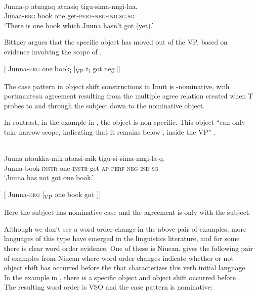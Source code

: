 \documentclass[output=paper]{LSP/langsci}
\begin{document}
\ea\label{ex:woolford:7}
\\
\gll Junna-p    atuagaq  ataasiq  tigu-sima-nngi-laa. \\
     Junaa-\textsc{erg}  book    one    get-\textsc{perf-neg-ind.sg.sg}\\
\glt ‘There is one book which Juuna hasn’t got (yet).’
\z

Bittner argues that the specific object has moved out of the VP, based on evidence involving the scope of . 

\ea\label{ex:woolford:8}
[ Junna-\textsc{erg}  one book\textsubscript{i}  [\textsubscript{VP}  t\textsubscript{i}     got.neg ]]
\z

The case pattern in object shift constructions in Inuit is -nominative, with portmanteau agreement resulting from the multiple agree relation created when T probes to and through the  subject down to the nominative object. 

In contrast, in the example in , the object is non-specific. This object “can only take narrow scope, indicating that it remains below , inside the VP” \citep[35]{bittner1994case}.

\ea\label{ex:woolford:9}
\\
\gll Juuna  ataukka-mik  ataasi-mik  tigu-si-sima-nngi-la-q.                           \\
     Junna  book-\textsc{instr} one-\textsc{instr}  get-\textsc{ap-perf-neg-ind-sg}  \\
\glt ‘Juuna has not got one book.’ 
\z

\ea\label{ex:woolford:10}
[ Junna-\textsc{erg}  [\textsubscript{VP}  one book     got ]]
\z

Here the subject has nominative case and the agreement is only with the subject.

Although we don’t see a word order change in the above pair of examples, more  languages of this type have emerged in the linguistics literature, and for some there is clear word order evidence. One of these is Niuean. \citet{massam2010} gives the following pair of examples from Niuean where word order changes indicate whether or not object shift has occurred before the  that characterizes this verb initial language. In the example in , there is a specific object and object shift occurred before . The resulting word order is VSO and the case pattern is  nominative:
\end{document}
